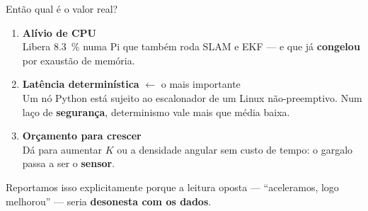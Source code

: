 \documentclass[aspectratio=169, 11pt]{beamer}
\begin{document}
\begin{frame}{Então qual é o valor real?}
\begin{enumerate}
\item \textbf{Alívio de CPU} \\
      \footnotesize Libera \SI{8.3}{\percent} numa Pi que também roda SLAM e EKF ---
      e que já \textbf{congelou} por exaustão de memória.
      \vspace{3mm}
\item \textbf{Latência determinística} \alert{$\leftarrow$ o mais importante} \\
      \footnotesize Um nó Python está sujeito ao escalonador de um Linux
      não-preemptivo. Num laço de \textbf{segurança}, determinismo vale mais que
      média baixa.
      \vspace{3mm}
\item \textbf{Orçamento para crescer} \\
      \footnotesize Dá para aumentar $K$ ou a densidade angular sem custo de tempo:
      o gargalo passa a ser o \textbf{sensor}.
\end{enumerate}

\vspace{4mm}
\centering
\footnotesize Reportamos isso explicitamente porque a leitura oposta ---
``aceleramos, logo melhorou'' --- seria \textbf{desonesta com os dados}.
\end{frame}
\end{document}
